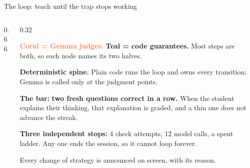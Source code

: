 \documentclass[aspectratio=169,11pt]{beamer}
\newcommand{\dimt}[1]{{\color{cream!62!gmbg}#1}}
\newcommand{\goldb}[1]{{\color{gold}\textbf{#1}}}
\newcommand{\tealb}[1]{{\color{teal}\textbf{#1}}}
\begin{document}
\begin{frame}{The loop: teach until the trap stops working}
\begin{columns}[T,onlytextwidth]
\begin{column}{0.66\textwidth}
\begin{center}
{}
      \end{center}
    \end{column}
    \begin{column}{0.32\textwidth}
      \vspace{0.2em}
      {\scriptsize \textcolor{coral}{\textbf{Coral = Gemma judges.}} \tealb{Teal = code guarantees.}
      Most steps are both, so each node names its two halves.\par
      \vspace{0.45em}
      \textbf{Deterministic spine.} Plain code runs the loop and owns every transition;
      Gemma is called only at the judgment points.\par
      \vspace{0.4em}
      \textbf{The bar:} \goldb{two fresh questions correct in a row.} When the student
      explains their thinking, that explanation is graded, and a thin one does not
      advance the streak.\par
      \vspace{0.4em}
      \textbf{Three independent stops:} 4 check attempts, 12 model calls, a spent ladder.
      Any one ends the session, so it cannot loop forever.\par
      \vspace{0.4em}
      \dimt{Every change of strategy is announced on screen, with its reason.}\par}
    \end{column}
  \end{columns}
\end{frame}
\end{document}
